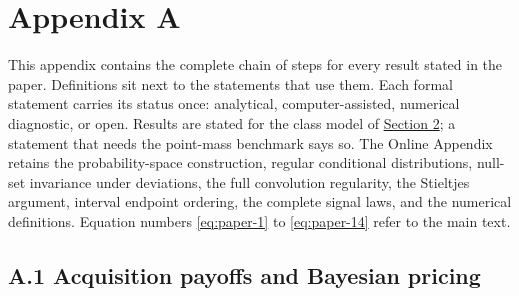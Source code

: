 
\section{Appendix A}\label{paper-appendix}

This appendix contains the complete chain of steps for every result
stated in the paper. Definitions sit next to the statements that use
them. Each formal statement carries its status once: analytical,
computer-assisted, numerical diagnostic, or open. Results are stated for
the class model of \hyperref[sec-model]{Section 2}; a statement that
needs the point-mass benchmark says so. The Online Appendix retains the
probability-space construction, regular conditional distributions,
null-set invariance under deviations, the full convolution regularity,
the Stieltjes argument, interval endpoint ordering, the complete signal
laws, and the numerical definitions. Equation numbers
\eqref{eq:paper-1} to \eqref{eq:paper-14} refer to the main text.

\subsection{A.1 Acquisition payoffs and Bayesian
pricing}\label{pa-results}

